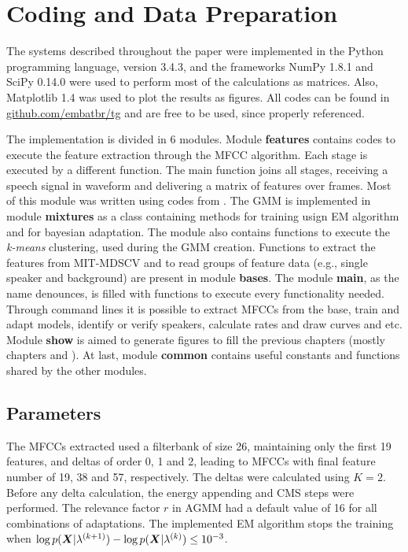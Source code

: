 \section{Coding and Data Preparation}
\label{sec:coding-and-data-preparation}

The systems described throughout the paper were implemented in the Python programming language, version 3.4.3, and the frameworks NumPy 1.8.1 and SciPy 0.14.0 were used to perform most of the calculations as matrices. Also, Matplotlib 1.4 was used to plot the results as figures. All codes can be found in \url{github.com/embatbr/tg} and are free to be used, since properly referenced.

The implementation is divided in 6 modules. Module \textbf{features} contains codes to execute the feature extraction through the MFCC algorithm. Each stage is executed by a different function. The main function joins all stages, receiving a speech signal in waveform and delivering a matrix of features over frames. Most of this module was written using codes from . The GMM is implemented in module \textbf{mixtures} as a class containing methods for training usign EM algorithm and for bayesian adaptation. The module also contains functions to execute the \emph{k-means} clustering, used during the GMM creation. Functions to extract the features from MIT-MDSCV and to read groups of feature data (e.g., single speaker and background) are present in module \textbf{bases}. The module \textbf{main}, as the name denounces, is filled with functions to execute every functionality needed. Through command lines it is possible to extract MFCCs from the base, train and adapt models, identify or verify speakers, calculate rates and draw curves and etc. Module \textbf{show} is aimed to generate figures to fill the previous chapters (mostly chapters  and ). At last, module \textbf{common} contains useful constants and functions shared by the other modules.

\subsection{Parameters}

The MFCCs extracted used a filterbank of size 26, maintaining only the first 19 features, and deltas of order 0, 1 and 2, leading to MFCCs with final feature number of 19, 38 and 57, respectively. The deltas were calculated using $K = 2$. Before any delta calculation, the energy appending and CMS steps were performed. The relevance factor $r$ in AGMM had a default value of 16 for all combinations of adaptations. The implemented EM algorithm stops the training when $\log p(\boldsymbol{X}|\lambda^{(k+1)}) - \log p(\boldsymbol{X}|\lambda^{(k)}) \le 10^{-3}$.

